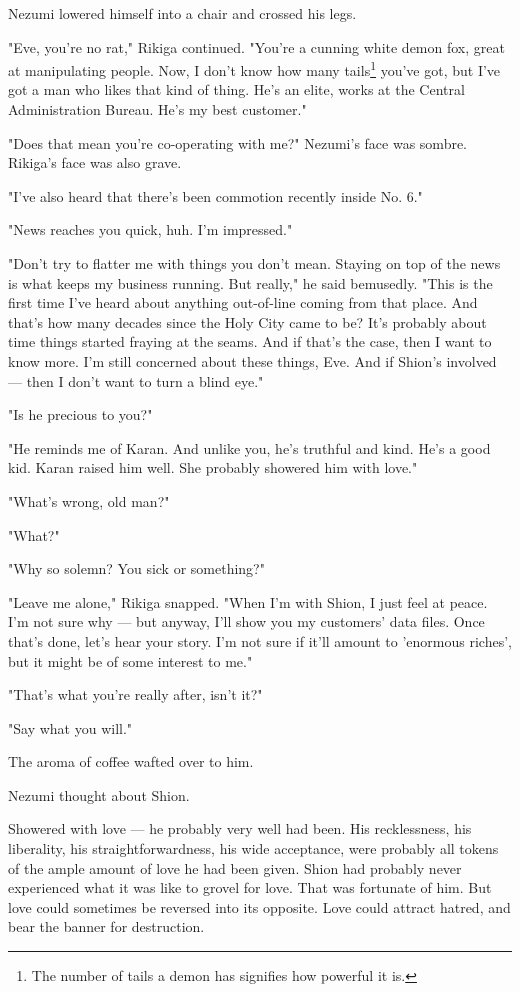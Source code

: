 Nezumi lowered himself into a chair and crossed his legs.

"Eve, you're no rat," Rikiga continued. "You're a cunning white demon
fox, great at manipulating people. Now, I don't know how many tails\footnote{The number of tails a demon has signifies how powerful it is.}
you've got, but I've got a man who likes that kind of thing. He's an
elite, works at the Central Administration Bureau. He's my best
customer."

"Does that mean you're co-operating with me?" Nezumi's face was sombre.
Rikiga's face was also grave.

"I've also heard that there's been commotion recently inside No. 6."

"News reaches you quick, huh. I'm impressed."

"Don't try to flatter me with things you don't mean. Staying on top of
the news is what keeps my business running. But really," he said
bemusedly. "This is the first time I've heard about anything out-of-line
coming from that place. And that's how many decades since the Holy City
came to be? It's probably about time things started fraying at the
seams. And if that's the case, then I want to know more. I'm still
concerned about these things, Eve. And if Shion's involved --- then I
don't want to turn a blind eye."

"Is he precious to you?"

"He reminds me of Karan. And unlike you, he's truthful and kind. He's a
good kid. Karan raised him well. She probably showered him with love."

"What's wrong, old man?"

"What?"

"Why so solemn? You sick or something?"

"Leave me alone," Rikiga snapped. "When I'm with Shion, I just feel at
peace. I'm not sure why --- but anyway, I'll show you my customers' data
files. Once that's done, let's hear your story. I'm not sure if it'll
amount to 'enormous riches', but it might be of some interest to me."

"That's what you're really after, isn't it?"

"Say what you will."

The aroma of coffee wafted over to him.

Nezumi thought about Shion.

Showered with love --- he probably very well had been. His recklessness,
his liberality, his straightforwardness, his wide acceptance, were
probably all tokens of the ample amount of love he had been given. Shion
had probably never experienced what it was like to grovel for love. That
was fortunate of him. But love could sometimes be reversed into its
opposite. Love could attract hatred, and bear the banner for
destruction.

